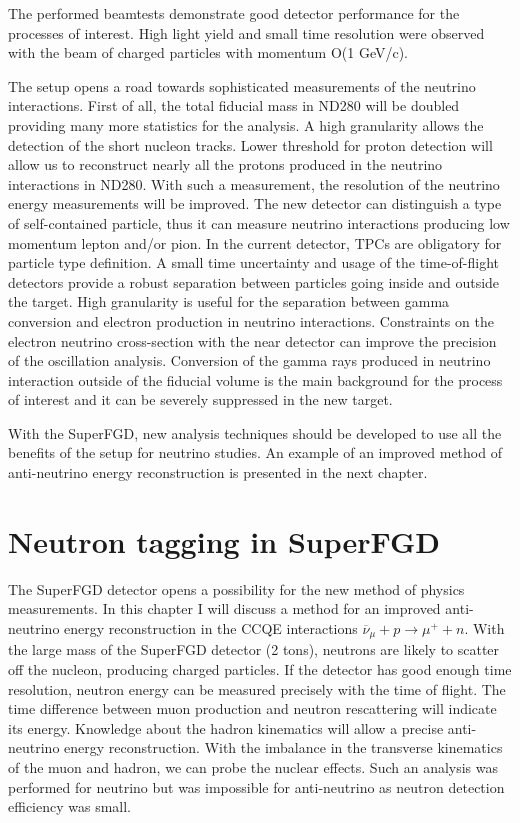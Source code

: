 \documentclass[main.tex]{subfiles}
\begin{document}
The performed beamtests demonstrate good detector performance for the processes of interest. High light yield and small time resolution were observed with the beam of charged particles with momentum O(1 GeV/c).

The setup opens a road towards sophisticated measurements of the neutrino interactions. First of all, the total fiducial mass in ND280 will be doubled providing many more statistics for the analysis. A high granularity allows the detection of the short nucleon tracks. Lower threshold for proton detection will allow us to reconstruct nearly all the protons produced in the neutrino interactions in ND280. With such a measurement, the resolution of the neutrino energy measurements will be improved. The new detector can distinguish a type of self-contained particle, thus it can measure neutrino interactions producing low momentum lepton and/or pion. In the current detector, TPCs are obligatory for particle type definition. A small time uncertainty and usage of the time-of-flight detectors provide a robust separation between particles going inside and outside the target. High granularity is useful for the separation between gamma conversion and electron production in neutrino interactions. Constraints on the electron neutrino cross-section with the near detector can improve the precision of the oscillation analysis. Conversion of the gamma rays produced in neutrino interaction outside of the fiducial volume is the main background for the process of interest and it can be severely suppressed in the new target.

With the SuperFGD, new analysis techniques should be developed to use all the benefits of the setup for neutrino studies. An example of an improved method of anti-neutrino energy reconstruction is presented in the next chapter.

\chapter{Neutron tagging in SuperFGD}
\label{ch:up:neutron}
The SuperFGD detector opens a possibility for the new method of physics measurements. In this chapter I will discuss a method for an improved anti-neutrino energy reconstruction in the CCQE interactions $\overline{\nu}_\mu+p\to\mu^++n$. With the large mass of the SuperFGD detector (2 tons), neutrons are likely to scatter off the nucleon, producing charged particles. If the detector has good enough time resolution, neutron energy can be measured precisely with the time of flight. The time difference between muon production and neutron rescattering will indicate its energy. Knowledge about the hadron kinematics will allow a precise anti-neutrino energy reconstruction. With the imbalance in the transverse kinematics of the muon and hadron, we can probe the nuclear effects. Such an analysis was performed for neutrino but was impossible for anti-neutrino as neutron detection efficiency was small.
\end{document}
